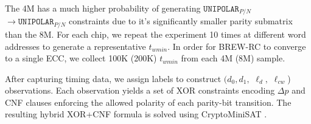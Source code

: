 
The 4M has a much higher probability of generating $\texttt{UNIPOLAR}_{P/N}$ $\to \texttt{UNIPOLAR}_{P/N}$ constraints due to it's significantly smaller parity submatrix than the 8M. For each chip, we repeat the experiment 10 times at different word addresses to generate a representative $t_{wmin}$. In order for BREW-RC to converge to a single ECC, we collect 100K (200K) $t_{wmin}$ from each 4M (8M) sample. 

After capturing timing data, we assign labels to construct $(d_0,d_1,$ $\ell_d,$ $\ell_{cw}$) observations. Each observation yields a set of XOR constraints encoding $\Delta p$ and CNF clauses enforcing the allowed polarity of each parity-bit transition. The resulting hybrid XOR+CNF formula is solved using CryptoMiniSAT \cite{soos2009extending, soos2018cryptominisat5}.

% 
